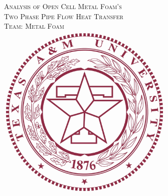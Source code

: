 %


\begin{titlepage}
\begin{center}



\textsc{\LARGE Analysis of Open Cell Metal Foam's }\\[0.75cm]
\textsc{\LARGE Two Phase Pipe Flow Heat Transfer}\\[0.75cm]
\textsc{\LARGE Team: Metal Foam}\\[1.5cm]


\includegraphics[height=8.5cm]{./figure/TAMUSeal.png}~\\[1cm]


\end{center}
\end{titlepage}
